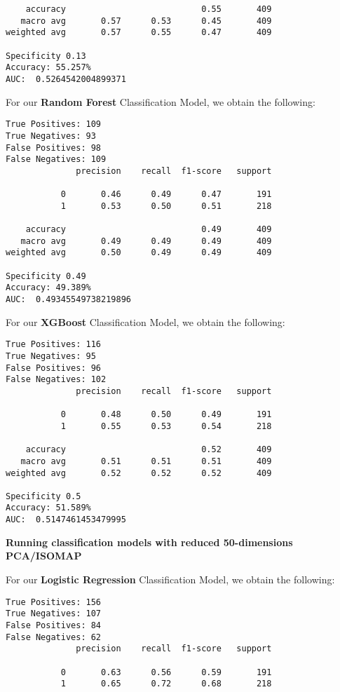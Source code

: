 \documentclass{article}
\begin{document}
\begin{titlepage}
\begin{itemize}
\begin{verbatim}
    accuracy                           0.55       409
   macro avg       0.57      0.53      0.45       409
weighted avg       0.57      0.55      0.47       409

Specificity 0.13
Accuracy: 55.257%
AUC:  0.5264542004899371
\end{verbatim}

For our \textbf{Random Forest} Classification Model, we obtain the following:

\begin{verbatim}
True Positives: 109
True Negatives: 93
False Positives: 98
False Negatives: 109
              precision    recall  f1-score   support

           0       0.46      0.49      0.47       191
           1       0.53      0.50      0.51       218

    accuracy                           0.49       409
   macro avg       0.49      0.49      0.49       409
weighted avg       0.50      0.49      0.49       409

Specificity 0.49
Accuracy: 49.389%
AUC:  0.49345549738219896
\end{verbatim}

For our \textbf{XGBoost} Classification Model, we obtain the following:

\begin{verbatim}
True Positives: 116
True Negatives: 95
False Positives: 96
False Negatives: 102
              precision    recall  f1-score   support

           0       0.48      0.50      0.49       191
           1       0.55      0.53      0.54       218

    accuracy                           0.52       409
   macro avg       0.51      0.51      0.51       409
weighted avg       0.52      0.52      0.52       409

Specificity 0.5
Accuracy: 51.589%
AUC:  0.5147461453479995
\end{verbatim}

\textbf{Running classification models with reduced 50-dimensions PCA/ISOMAP}

For our \textbf{Logistic Regression} Classification Model, we obtain the following:

\begin{verbatim}
True Positives: 156
True Negatives: 107
False Positives: 84
False Negatives: 62
              precision    recall  f1-score   support

           0       0.63      0.56      0.59       191
           1       0.65      0.72      0.68       218


\end{verbatim}
\end{itemize}
\end{titlepage}
\end{document}
